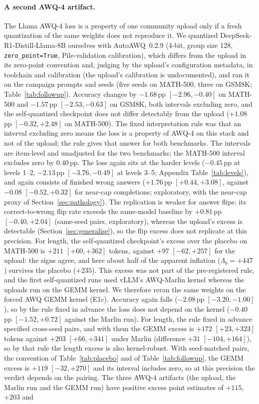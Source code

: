 \documentclass[11pt,a4paper]{article}
\begin{document}
\paragraph{A second AWQ-4 artifact.} The Llama AWQ-4 loss is a property of one community upload only if a fresh quantization of the same weights does not reproduce it. We quantized DeepSeek-R1-Distill-Llama-8B ourselves with AutoAWQ~0.2.9 (4-bit, group size 128, \texttt{zero\_point=True}, Pile-validation calibration), which differs from the upload in its zero-point convention and, judging by the upload's configuration metadata, in toolchain and calibration (the upload's calibration is undocumented), and ran it on the campaign prompts and seeds (five seeds on MATH-500, three on GSM8K; Table~\ref{tab:followup}). Accuracy changes by $-1.68$\,pp $[-2.96,-0.40]$ on MATH-500 and $-1.57$\,pp $[-2.53,-0.63]$ on GSM8K, both intervals excluding zero, and the self-quantized checkpoint does not differ detectably from the upload ($+1.08$\,pp $[-0.32,+2.48]$ on MATH-500). The fixed interpretation rule was that an interval excluding zero means the loss is a property of AWQ-4 on this stack and not of the upload; the rule gives that answer for both benchmarks. The intervals are item-level and unadjusted for the two benchmarks; the MATH-500 interval excludes zero by $0.40$\,pp. The loss again sits at the harder levels ($-0.45$\,pp at levels 1--2, $-2.13$\,pp $[-3.76,-0.49]$ at levels 3--5; Appendix Table~\ref{tab:levels}), and again consists of finished wrong answers ($+1.76$\,pp $[+0.44,+3.08]$, against $-0.08$ $[-0.52,+0.32]$ for near-cap completions; exploratory, with the near-cap proxy of Section~\ref{sec:pathology}). The replication is weaker for answer flips: its correct-to-wrong flip rate exceeds the same-model baseline by $+0.81$\,pp $[-0.40,+2.04]$ (same-seed pairs, exploratory), whereas the upload's excess is detectable (Section~\ref{sec:generalise}), so the flip excess does not replicate at this precision. For length, the self-quantized checkpoint's excess over the placebo on MATH-500 is $+211$ $[+60,+362]$ tokens, against $+97$ $[-62,+257]$ for the upload: the signs agree, and here about half of the apparent inflation ($\Lambda_b=+447$) survives the placebo ($+235$). This excess was not part of the pre-registered rule, and the first self-quantized runs used vLLM's AWQ-Marlin kernel whereas the uploads run on the GEMM kernel. We therefore reran the same weights on the forced AWQ GEMM kernel (E1c). Accuracy again falls ($-2.08$\,pp $[-3.20,-1.00]$), so by the rule fixed in advance the loss does not depend on the kernel ($-0.40$\,pp $[-1.52,+0.72]$ against the Marlin run). For length, the rule fixed in advance specified cross-seed pairs, and with them the GEMM excess is $+172$ $[+23,+323]$ tokens against $+203$ $[+66,+341]$ under Marlin (difference $+31$ $[-104,+164]$), so by that rule the length excess is also kernel-robust. With seed-matched pairs, the convention of Table~\ref{tab:placebo} and of Table~\ref{tab:followup}, the GEMM excess is $+119$ $[-32,+270]$ and its interval includes zero, so at this precision the verdict depends on the pairing. The three AWQ-4 artifacts (the upload, the Marlin run and the GEMM run) have positive excess point estimates of $+115$, $+203$ and 
\end{document}
